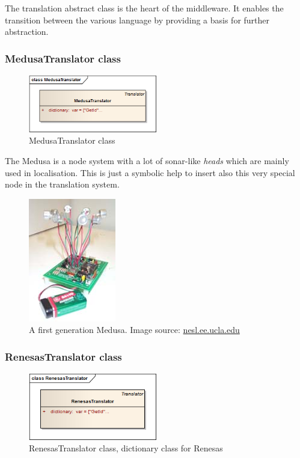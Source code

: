 The translation abstract class is the heart of the middleware. It enables the transition between the various language by providing a basis for further 
abstraction.

\subsubsection{MedusaTranslator class}
\begin{figure}[H]
   \centering
   \includegraphics[width=0.5\textwidth]{pic/MedusaTranslator.png}%
   \caption{MedusaTranslator class}
   \label{MedusaTranslatorpic}%
\end{figure}

The Medusa is a node system with a lot of sonar-like \textit{heads} which are mainly used in localisation.\cite{Dispert}
This is just a symbolic help to insert also this very special node in the translation system.

\begin{figure}[H]
   \centering
   \includegraphics{pic/medusa.jpg}%
   \caption{A first generation Medusa. Image source: \url{nesl.ee.ucla.edu}}
   \label{Medusapic}%
\end{figure}


\subsubsection{RenesasTranslator class}
\begin{figure}[H]
   \centering
   \includegraphics[width=0.5\textwidth]{pic/RenesasTranslator.png}%
   \caption{RenesasTranslator class, dictionary class for Renesas}
   \label{RenesasTranslatorpic}%
\end{figure}


